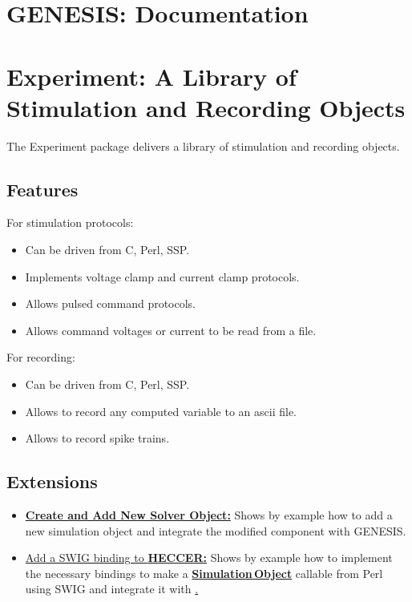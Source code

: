 \documentclass[12pt]{article}
\begin{document}
\section*{GENESIS: Documentation}

\section*{Experiment: A Library of Stimulation and Recording Objects}

The Experiment package delivers a library of stimulation and recording
objects.

\subsection*{Features}

For stimulation protocols:
\begin{itemize}
\item Can be driven from C, Perl, SSP.
\item Implements voltage clamp and current clamp protocols.
\item Allows pulsed command protocols.
\item Allows command voltages or current to be read from a file.
\end{itemize} 

For recording:
\begin{itemize}
\item Can be driven from C, Perl, SSP.
\item Allows to record any computed variable to an ascii file.
\item Allows to record spike trains.
\end{itemize} 

\subsection*{Extensions}
\begin{itemize}
\item
  \href{../genesis-add-object-solver/genesis-add-object-solver.tex}{\bf
    Create and Add New Solver Object:} Shows by example how to add a
  new simulation object and integrate the modified component with
  GENESIS.
\item
  \href{../genesis-add-swigbinding-heccer/genesis-add-swigbinding-heccer.tex}{Add
    a SWIG binding to {\bf HECCER:}} Shows by example how to implement
  the necessary bindings to make a
  \href{../simulation-objects/simulation-objects.tex}{\bf
    Simulation\,Object} callable from Perl using SWIG and integrate it
  with \href{../ssp/ssp.tex}.
\end{itemize}
\end{document}
